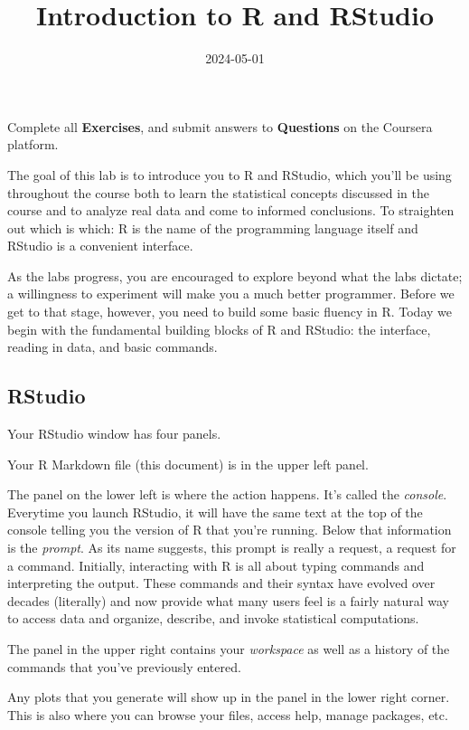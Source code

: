 \documentclass[
]{article}
\title{Introduction to R and RStudio}
\author{}
\date{\vspace{-2.5em}2024-05-01}
\begin{document}
\maketitle

\label{instructions}
Complete all \textbf{Exercises}, and submit answers to
\textbf{Questions} on the Coursera platform.

The goal of this lab is to introduce you to R and RStudio, which you'll
be using throughout the course both to learn the statistical concepts
discussed in the course and to analyze real data and come to informed
conclusions. To straighten out which is which: R is the name of the
programming language itself and RStudio is a convenient interface.

As the labs progress, you are encouraged to explore beyond what the labs
dictate; a willingness to experiment will make you a much better
programmer. Before we get to that stage, however, you need to build some
basic fluency in R. Today we begin with the fundamental building blocks
of R and RStudio: the interface, reading in data, and basic commands.

\subsection{RStudio}\label{rstudio}

Your RStudio window has four panels.

Your R Markdown file (this document) is in the upper left panel.

The panel on the lower left is where the action happens. It's called the
\emph{console}. Everytime you launch RStudio, it will have the same text
at the top of the console telling you the version of R that you're
running. Below that information is the \emph{prompt}. As its name
suggests, this prompt is really a request, a request for a command.
Initially, interacting with R is all about typing commands and
interpreting the output. These commands and their syntax have evolved
over decades (literally) and now provide what many users feel is a
fairly natural way to access data and organize, describe, and invoke
statistical computations.

The panel in the upper right contains your \emph{workspace} as well as a
history of the commands that you've previously entered.

Any plots that you generate will show up in the panel in the lower right
corner. This is also where you can browse your files, access help,
manage packages, etc.
\end{document}
